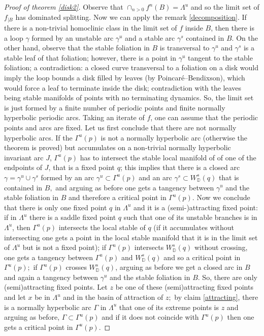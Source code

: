 \documentclass[a4paper,11pt]{article}
\theoremstyle{definition}
\def\DD{{\mathbb D}}
\def\La{\Lambda}
\def\ga{\gamma}
\def\Ga{\Gamma}
\def\La{\Lambda}
\def\Ga{\Gamma}
\begin{document}
\begin{proof}[Proof of theorem \ref{disk2}]
 

Observe that $\cap_{n>0} f^n(B)=\La^u$ and so the limit set of $f_{|B}$ has dominated splitting. Now we can apply the remark \ref{decomposition}. 
If there is a non-trivial homoclinic class in the limit set of $f$ inside $B$,  then there is a loop $\ga$ formed by an unstable arc $\ga^u$ and a stable arc $\ga^s$ contained in $B$. On the other hand, observe that the stable foliation in $B$ is transversal to $\ga^u$ and $\ga^s$ is a stable leaf of that foliation; however, there is a point in $\ga^u$ tangent to the stable foliation; a contradiction: a closed curve transversal to a foliation on a disk would imply the loop bounds a disk filled by leaves (by Poincar\'e–Bendixson), which would force a leaf to terminate inside the disk; contradiction with the leaves being stable manifolds of points with no terminating dynamics. So, the limit set is just formed by a  finite number of periodic points and finite normally hyperbolic  periodic arcs. Taking an iterate of $f$, one can assume that the periodic points and arcs are fixed. Let us first conclude that there are not normally hyperbolic arcs. If the $\Ga^u(p)$ is not a normally hyperbolic arc (otherwise the theorem is proved) but  accumulates on a non-trivial normally hyperbolic invariant arc $J$, $\Ga^u(p)$ has to intersect the stable local manifold of of one of the  endpoints of $J$, that is a fixed point $q$; this implies that there is a closed arc $\ga=\ga^u\cup \ga^s$ formed by an arc  $\ga^u\subset \Ga^u(p) $ and an arc $\ga^s\subset W^s_\DD(q)$ that is contained in $B,$ and arguing as before one gets a tangency between $\ga^u$ and the stable foliation in $B$ and therefore a critical point in $\Ga^u(p)$. Now we  conclude that there is only one fixed point $q$ in $\La^u$ and it is a (semi-)attracting fixed point: if in $\La^u$ there is a saddle fixed point $q$ such that one of its unstable branches is in $\La^u$, then $\Ga^u(p)$ intersects the local stable of $q$ (if it accumulates without intersecting one gets a point in the local stable manifold that it is in the limit set of $\La^u$ but is not a fixed point); if $\Ga^u(p)$ intersects $W^s_\DD(q)$ without crossing, one gets a tangency between $\Ga^u(p)$ and $W^s_\DD(q)$ and so a critical point in $\Ga^u(p);$  if $\Ga^u(p)$ crosses  $W^s_\DD(q)$, arguing as before we get a closed arc in $B$ and again a tangency between $\ga^u$ and the stable foliation in $B$. So, there are only (semi)attracting fixed points. Let $z$ be one of these (semi)attracting fixed points and let $x$ be in $\La^u$ and in the basin of attraction of $z;$ by claim \ref{attracting}, there is a normally hyperbolic arc $\Ga$ in $\La^u$ that one of its extreme points is  $z$  and arguing as before, $\Ga\subset \Ga^u(p)$ and if it does not coincide with $\Ga^u(p)$ then one gets a  critical point in $\Ga^u(p).$




\end{proof}
\end{document}

